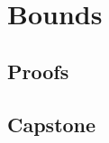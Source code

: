 \chapter{Bounds}
\label{chap:bounding}

\LRAExcludeFromPrintEditionBegin
\section*{Proofs}

\section*{Capstone}

\LRAExcludeFromPrintEditionEnd
